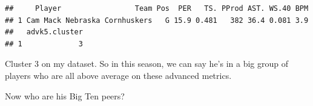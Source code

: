 \documentclass[]{book}
\newenvironment{Shaded}{\begin{snugshade}}{\end{snugshade}}
\newcommand{\DecValTok}[1]{\textcolor[rgb]{0.00,0.00,0.81}{#1}}
\newcommand{\KeywordTok}[1]{\textcolor[rgb]{0.13,0.29,0.53}{\textbf{#1}}}
\newcommand{\NormalTok}[1]{#1}
\newcommand{\OperatorTok}[1]{\textcolor[rgb]{0.81,0.36,0.00}{\textbf{#1}}}
\newcommand{\StringTok}[1]{\textcolor[rgb]{0.31,0.60,0.02}{#1}}
\begin{document}
\begin{Shaded}
\end{Shaded}

\begin{verbatim}
##     Player                 Team Pos  PER   TS. PProd AST. WS.40 BPM
## 1 Cam Mack Nebraska Cornhuskers   G 15.9 0.481   382 36.4 0.081 3.9
##   advk5.cluster
## 1             3
\end{verbatim}

Cluster 3 on my dataset. So in this season, we can say he's in a big group of players who are all above average on these advanced metrics.

Now who are his Big Ten peers?

\begin{Shaded}
\end{Shaded}
\end{document}
